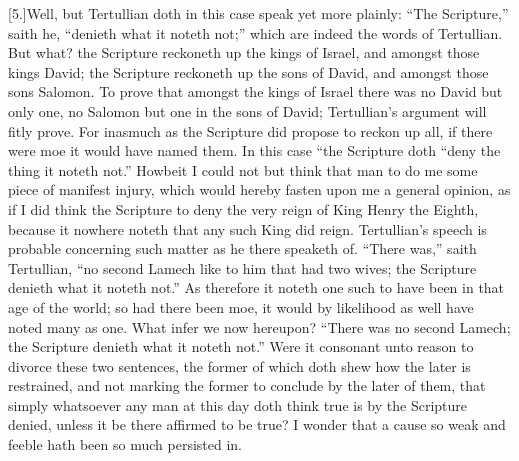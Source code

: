 [5.]Well, but Tertullian doth in this case speak yet more plainly: “The Scripture,” saith he, “denieth what it noteth not;” which are indeed the words of Tertullian. But what? the Scripture reckoneth up the kings of Israel, and amongst those kings David; the Scripture reckoneth up the sons of David, and amongst those sons Salomon. To prove that amongst the kings of Israel there was no David but only one, no Salomon but one in the sons of David; Tertullian’s argument will fitly prove. For inasmuch as the Scripture did propose to reckon up all, if there were moe it would have named them. In this case “the Scripture doth  “deny the thing it noteth not.” Howbeit I could not but think that man to do me some piece of manifest injury, which would hereby fasten upon me a general opinion, as if I did think the Scripture to deny the very reign of King Henry the Eighth, because it nowhere noteth that any such King did reign. Tertullian’s speech is probable concerning such matter as he there speaketh of. “There was,” saith Tertullian, “no second Lamech like to him that had two wives; the Scripture denieth what it noteth not.” As therefore it noteth one such to have been in that age of the world; so had there been moe, it would by likelihood as well have noted many as one. What infer we now hereupon? “There was no second Lamech; the Scripture denieth what it noteth not.” Were it consonant unto reason to divorce these two sentences, the former of which doth shew how the later is restrained, and not marking the former to conclude by the later of them, that simply whatsoever any man at this day doth think true is by the Scripture denied, unless it be there affirmed to be true? I wonder that a cause so weak and feeble hath been so much persisted in.

